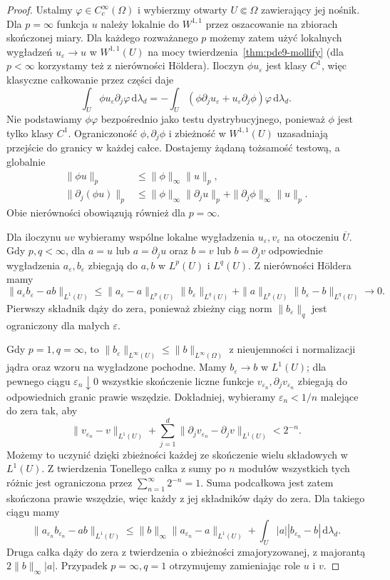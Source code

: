 \begin{proof}
Ustalmy $\varphi\in C_c^\infty(\Omega)$ i wybierzmy
otwarty $U\Subset\Omega$ zawierający jej nośnik.
Dla $p=\infty$ funkcja $u$ należy lokalnie do $W^{1,1}$
przez oszacowanie na zbiorach skończonej miary.
Dla każdego rozważanego $p$ możemy zatem użyć lokalnych
wygładzeń $u_\varepsilon\to u$ w $W^{1,1}(U)$ na mocy
twierdzenia~\ref{thm:pde9-mollify} (dla $p<\infty$
korzystamy też z nierówności Höldera).
Iloczyn $\phi u_\varepsilon$ jest klasy $C^1$,
więc klasyczne całkowanie przez części daje
\[
 \int_U\phi u_\varepsilon\partial_j\varphi\,\mathrm d\lambda_d
 =-\int_U(\phi\partial_j u_\varepsilon
          +u_\varepsilon\partial_j\phi)\varphi\,\mathrm d\lambda_d.
\]
Nie podstawiamy $\phi\varphi$ bezpośrednio jako testu
dystrybucyjnego, ponieważ $\phi$ jest tylko klasy $C^1$.
Ograniczoność $\phi,\partial_j\phi$ i zbieżność
w $W^{1,1}(U)$ uzasadniają przejście do granicy
w każdej całce. Dostajemy żądaną tożsamość testową,
a globalnie
\[
 \begin{aligned}
 \|\phi u\|_p&\le\|\phi\|_\infty\|u\|_p,\\
 \|\partial_j(\phi u)\|_p
 &\le\|\phi\|_\infty\|\partial_j u\|_p+
      \|\partial_j\phi\|_\infty\|u\|_p .
 \end{aligned}
\]
Obie nierówności obowiązują również dla $p=\infty$.

Dla iloczynu $uv$ wybieramy wspólne lokalne wygładzenia
$u_\varepsilon,v_\varepsilon$ na otoczeniu $\overline U$.
Gdy $p,q<\infty$, dla $a=u$ lub $a=\partial_j u$
oraz $b=v$ lub $b=\partial_j v$ odpowiednie wygładzenia
$a_\varepsilon,b_\varepsilon$ zbiegają do $a,b$
w $L^p(U)$ i $L^q(U)$. Z nierówności Höldera mamy
\[
 \|a_\varepsilon b_\varepsilon-ab\|_{L^1(U)}
 \le\|a_\varepsilon-a\|_{L^p(U)}\|b_\varepsilon\|_{L^q(U)}
    +\|a\|_{L^p(U)}\|b_\varepsilon-b\|_{L^q(U)}\to0.
\]
Pierwszy składnik dąży do zera, ponieważ zbieżny
ciąg norm $\|b_\varepsilon\|_q$ jest ograniczony
dla małych $\varepsilon$.

Gdy $p=1,q=\infty$, to $\|b_\varepsilon\|_{L^\infty(U)}
\le\|b\|_{L^\infty(\Omega)}$ z nieujemności i normalizacji
jądra oraz wzoru na wygładzone pochodne.
Mamy $b_\varepsilon\to b$ w $L^1(U)$; dla pewnego
ciągu $\varepsilon_n\downarrow0$ wszystkie skończenie
liczne funkcje $v_{\varepsilon_n},\partial_jv_{\varepsilon_n}$
zbiegają do odpowiednich granic prawie wszędzie.
Dokładniej, wybieramy $\varepsilon_n<1/n$ malejące
do zera tak, aby
\[
 \|v_{\varepsilon_n}-v\|_{L^1(U)}
 +\sum_{j=1}^d\|\partial_jv_{\varepsilon_n}
                 -\partial_jv\|_{L^1(U)}<2^{-n}.
\]
Możemy to uczynić dzięki zbieżności każdej ze
skończenie wielu składowych w $L^1(U)$.
Z twierdzenia Tonellego całka z sumy po $n$
modułów wszystkich tych różnic jest ograniczona
przez $\sum_{n=1}^\infty 2^{-n}=1$.
Suma podcałkowa jest zatem skończona prawie
wszędzie, więc każdy z jej składników dąży do zera.
Dla takiego ciągu mamy
\[
 \|a_{\varepsilon_n}b_{\varepsilon_n}-ab\|_{L^1(U)}
 \le \|b\|_\infty\|a_{\varepsilon_n}-a\|_{L^1(U)}
      +\int_U|a||b_{\varepsilon_n}-b|\,\mathrm d\lambda_d .
\]
Druga całka dąży do zera z twierdzenia o zbieżności
zmajoryzowanej, z majorantą $2\|b\|_\infty|a|$.
Przypadek $p=\infty,q=1$ otrzymujemy zamieniając
role $u$ i $v$.


\end{proof}
